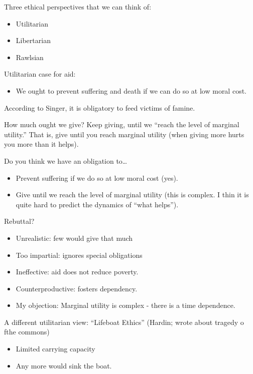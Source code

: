 \documentclass{article}
\begin{document}
Three ethical perspectives that we can think of:

\begin{itemize}
  \item Utilitarian
  \item Libertarian
  \item Rawlsian
\end{itemize}

Utilitarian case for aid:
\begin{itemize}
  \item We ought to prevent suffering and death if we can do so at low moral cost.
\end{itemize}

According to Singer, it is obligatory to feed victims of famine.

How much ought we give?  Keep giving, until we ``reach the level of marginal utility.''  That is, give until you reach marginal utility (when giving more hurts you more than it helps).

Do you think we have an obligation to\ldots
\begin{itemize}
  \item Prevent suffering if we do so at low moral cost (yes).
  \item Give until we reach the level of marginal utility (this is complex.  I thin it is quite hard to predict the dynamics of ``what helps'').
\end{itemize}

Rebuttal?

\begin{itemize}
  \item Unrealistic: few would give that much
  \item Too impartial: ignores special obligations
  \item Ineffective: aid does not reduce poverty.
  \item Counterproductive: fosters dependency.
  \item My objection: Marginal utility is complex - there is a time dependence.
\end{itemize}

A different utilitarian view: ``Lifeboat Ethics'' (Hardin; wrote about tragedy o fthe commons)

\begin{itemize}
  \item Limited carrying capacity
  \item Any more would sink the boat.
\end{itemize}
\end{document}
